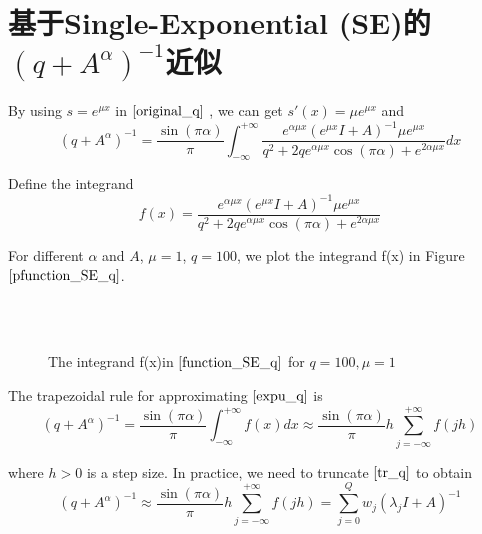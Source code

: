 \section{基于Single-Exponential (SE)的$(q+{A}^{\alpha})^{-1}$近似}

By using  $s=e^{\mu x}$ in $\eqref{original_q}$ \cite{Harizanov2020ASO} , we can get $s'(x)=\mu e^{\mu x}$ and
\begin{equation}
	(q+{A}^{\alpha})^{-1}=\frac{\sin(\pi \alpha)}{\pi}\int_{-\infty}^{+\infty}\frac{e^{\alpha\mu x}(e^{\mu x} I+A)^{-1}\mu e^{\mu x}}{q^2+2qe^{\alpha\mu x}\cos(\pi\alpha)+e^{2\alpha\mu x}} dx
	\label{expu_q}
\end{equation}

Define the integrand
\begin{equation}
	f(x)=\frac{e^{\alpha\mu x}(e^{\mu x} I+A)^{-1}\mu e^{\mu x}}{q^2+2qe^{\alpha\mu x}\cos(\pi\alpha)+e^{2\alpha\mu x}}
	\label{function_SE_q}
\end{equation}

For different $\alpha$ and $A$, $\mu=1$, $q=100$, we plot the integrand f(x) in Figure $\ref{pfunction_SE_q}$.
\begin{figure}[htbp]
\centering
{}
~~
~~
~~
\\
~~
~~
~~
\caption{The integrand f(x)in $\eqref{function_SE_q}$ for $q=100,\mu=1$}
\label{pfunction_SE_q}
\end{figure}

The trapezoidal rule for approximating $\eqref{expu_q}$ is
\begin{equation}
	(q+{A}^{\alpha})^{-1}=\frac{\sin(\pi \alpha)}{\pi}\int_{-\infty}^{+\infty}f(x)dx\approx \frac{\sin(\pi \alpha)}{\pi} h \sum_{j=-\infty}^{+\infty} f(jh)
	\label{tr_q}
\end{equation}

where $h>0$ is a step size. In practice, we need to truncate $\eqref{tr_q}$ to obtain
\begin{equation}
	(q+{A}^{\alpha})^{-1}\approx \frac{\sin(\pi \alpha)}{\pi} h\sum_{j=-\infty}^{+\infty} f(jh)
	=\sum_{j=0}^{Q}w_j(\lambda_jI+A)^{-1}
	\label{SE_q}
\end{equation}

